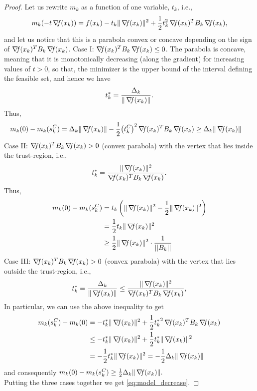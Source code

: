 \documentclass[10pt,a4paper]{article}
\begin{document}
\begin{proof}
	Let us rewrite $m_k$ as a function of one variable, $t_k$, i.e., 
	$$m_k(-t \operatorname*{\mathit{\nabla \!f}}(x_k))=f(x_k) -t_k \|\operatorname*{\mathit{\nabla \!f}}(x_k)\|^2 + \frac{1}{2}t_k^2\operatorname*{\mathit{\nabla \!f}}(x_k)^T B_k\operatorname*{\mathit{\nabla \!f}}(x_k),$$
	and let us notice that this is a parabola convex or concave depending on the sign of $\operatorname*{\mathit{\nabla \!f}}(x_k)^T B_k\operatorname*{\mathit{\nabla \!f}}(x_k)$. 
	Case I: $\operatorname*{\mathit{\nabla \!f}}(x_k)^T B_k \operatorname*{\mathit{\nabla \!f}}(x_k) \leq 0$. The parabola is concave, meaning that it is monotonically decreasing (along the gradient) for increasing values of $t > 0$, so that, the minimizer is the upper bound of the interval defining the feasible set, and hence we have
	\begin{equation*}
		t^*_k = \frac{\Delta_k}{\|\operatorname*{\mathit{\nabla \!f}}(x_k)\|}.
	\end{equation*}
Thus, 
\begin{align*}
	m_k(0) - m_k(s_k^C) & = \Delta_k \|\operatorname*{\mathit{\nabla \!f}}(x_k)\| - \frac{1}{2}{\left(t_k^C\right)}^2\operatorname*{\mathit{\nabla \!f}}(x_k)^T B_k\operatorname*{\mathit{\nabla \!f}}(x_k) \geq \Delta_k \|\operatorname*{\mathit{\nabla \!f}}(x_k)\|
\end{align*}
Case II: $\operatorname*{\mathit{\nabla \!f}}(x_k)^T B_k \operatorname*{\mathit{\nabla \!f}}(x_k) > 0$ (convex parabola) with the vertex that lies inside the trust-region, i.e., 
$$t^*_k = \frac{\|\operatorname*{\mathit{\nabla \!f}}(x_k)\|^2}{\operatorname*{\mathit{\nabla \!f}}(x_k)^T B_k \operatorname*{\mathit{\nabla \!f}}(x_k)}.$$
Thus, 
\begin{align*}
	m_k(0) - m_k(s_k^C) &=  t_k \left(\|\grad(x_k)\|^2 - \frac{1}{2} \|\grad(x_k)\|^2 \right)\\
	& = \frac{1}{2} t_k \|\grad(x_k)\|^2\\
	&\geq \frac{1}{2} \|\grad(x_k)\|^2 \cdot \frac{1}{||B_k||} %
\end{align*}
	Case III: $\operatorname*{\mathit{\nabla \!f}}(x_k)^T B_k \operatorname*{\mathit{\nabla \!f}}(x_k) > 0$ (convex parabola) with the vertex that lies outside the trust-region, i.e., 
	\begin{equation*}
		t^*_k = \frac{\Delta_k}{\|\operatorname*{\mathit{\nabla \!f}}(x_k)\|} \leq \frac{\|\operatorname*{\mathit{\nabla \!f}}(x_k)\|^2}{\operatorname*{\mathit{\nabla \!f}}(x_k)^T B_k \operatorname*{\mathit{\nabla \!f}}(x_k)},
	\end{equation*}
In particular, we can use the above inequality to get
\begin{align*}
m_k(s_k^C) -m_k(0) & =  -t_k^* \|\operatorname*{\mathit{\nabla \!f}}(x_k)\|^2 + \frac{1}{2} {t_k^*}^2 \operatorname*{\mathit{\nabla \!f}}(x_k)^T B_k \operatorname*{\mathit{\nabla \!f}}(x_k) \\
&\leq -t_k^* \|\operatorname*{\mathit{\nabla \!f}}(x_k)\|^2 + \frac{1}{2} t_k^* \|\operatorname*{\mathit{\nabla \!f}}(x_k)\|^2\\
& =-\frac{1}{2} t_k^* \|\operatorname*{\mathit{\nabla \!f}}(x_k)\|^2 = -\frac{1}{2} \Delta_k \|\operatorname*{\mathit{\nabla \!f}}(x_k)\|
\end{align*}
and consequently $m_k(0)- m_k(s_k^C) \geq \frac{1}{2} \Delta_k \|\operatorname*{\mathit{\nabla \!f}}(x_k)\|.$\\
Putting the three cases together we get \eqref{eq:model_decrease}.
\end{proof}
\end{document}
